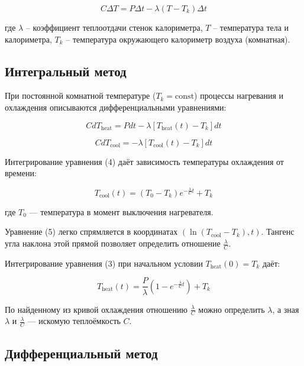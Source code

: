\documentclass{article}
\begin{document}
	\begin{equation}
		C\Delta T = P\Delta t - \lambda(T - T_k)\Delta t \tag{2}
	\end{equation}
	
	где $\lambda$ – коэффициент теплоотдачи стенок калориметра, $T$ – температура тела и калориметра, $T_k$ – температура окружающего калориметр воздуха (комнатная).
	
	\subsection*{Интегральный метод}
	
	При постоянной комнатной температуре ($T_k = \text{const}$) процессы нагревания и охлаждения описываются дифференциальными уравнениями:
	
	\begin{equation}
		C dT_{\text{heat}} = P dt - \lambda [T_{\text{heat}}(t) - T_k] dt \tag{3}
	\end{equation}
	
	\begin{equation}
		C dT_{\text{cool}} = -\lambda [T_{\text{cool}}(t) - T_k] dt \tag{4}
	\end{equation}
	
	Интегрирование уравнения (4) даёт зависимость температуры охлаждения от времени:
	
	\begin{equation}
		T_{\text{cool}}(t) = (T_0 - T_k) e^{-\frac{\lambda}{C}t} + T_k \tag{5}
	\end{equation}
	
	где $T_0$ — температура в момент выключения нагревателя.
	
	Уравнение (5) легко спрямляется в координатах $(\ln(T_{\text{cool}}-T_k), t)$. Тангенс угла наклона этой прямой позволяет определить отношение $\frac{\lambda}{C}$.
	
	Интегрирование уравнения (3) при начальном условии $T_{\text{heat}}(0) = T_k$ даёт:
	
	\begin{equation}
		T_{\text{heat}}(t) = \frac{P}{\lambda}(1 - e^{-\frac{\lambda}{C}t}) + T_k \tag{6}
	\end{equation}
	
	По найденному из кривой охлаждения отношению $\frac{\lambda}{C}$ можно определить $\lambda$, а зная $\lambda$ и $\frac{\lambda}{C}$ — искомую теплоёмкость $C$.
	
	\subsection*{Дифференциальный метод}
	
\end{document}
